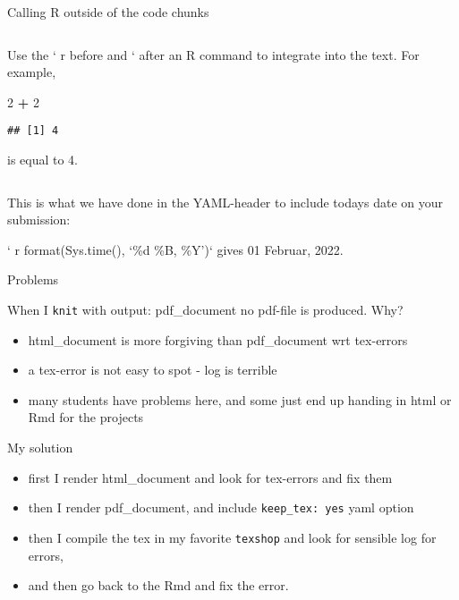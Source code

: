 \documentclass[10pt,ignorenonframetext,]{beamer}
\newenvironment{Shaded}{\begin{snugshade}}{\end{snugshade}}
\newcommand{\DecValTok}[1]{\textcolor[rgb]{0.00,0.00,0.81}{#1}}
\newcommand{\OperatorTok}[1]{\textcolor[rgb]{0.81,0.36,0.00}{\textbf{#1}}}
\newcommand{\StringTok}[1]{\textcolor[rgb]{0.31,0.60,0.02}{#1}}
\providecommand{\tightlist}{%
  \setlength{\itemsep}{0pt}\setlength{\parskip}{0pt}}
\begin{document}
\begin{frame}[fragile]

\begin{block}{Calling R outside of the code chunks}

\(~\)

Use the ` r before and ` after an R command to integrate into the text.
For example,

\begin{Shaded}
\begin{Highlighting}[]
\DecValTok{2} \OperatorTok{+}\StringTok{ }\DecValTok{2}
\end{Highlighting}
\end{Shaded}

\begin{verbatim}
## [1] 4
\end{verbatim}

is equal to 4.

\(~\)

This is what we have done in the YAML-header to include todays date on
your submission:

` r format(Sys.time(), `\%d \%B, \%Y')` gives 01 Februar, 2022.

\end{block}

\end{frame}

\begin{frame}[fragile]{Problems}
\protect\hypertarget{problems}{}

\begin{block}{When I \texttt{knit} with output: pdf\_document no
pdf-file is produced. Why?}

\begin{itemize}
\tightlist
\item
  html\_document is more forgiving than pdf\_document wrt tex-errors
\item
  a tex-error is not easy to spot - log is terrible
\item
  many students have problems here, and some just end up handing in html
  or Rmd for the projects
\end{itemize}

My solution

\begin{itemize}
\tightlist
\item
  first I render html\_document and look for tex-errors and fix them
\item
  then I render pdf\_document, and include \texttt{keep\_tex:\ yes} yaml
  option
\item
  then I compile the tex in my favorite \texttt{texshop} and look for
  sensible log for errors,
\item
  and then go back to the Rmd and fix the error.
\end{itemize}

\end{block}

\end{frame}
\end{document}
